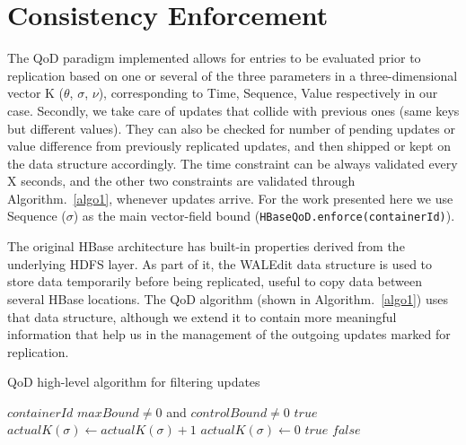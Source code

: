 \section{Consistency Enforcement}\label{architecture:consistency}
The QoD paradigm implemented allows for entries to be evaluated prior to replication based on one or several of the three parameters in a three-dimensional vector K ($\theta$, $\sigma$, $\nu$), corresponding to Time, Sequence, Value respectively in our case. Secondly, we take care of updates that collide with previous ones (same keys but different values). They can also be checked for number of pending updates or value difference from previously replicated updates, and then shipped or kept on the data structure accordingly. The time constraint can be always validated every X seconds, and the other two constraints are validated through Algorithm.~\ref{algo1}, whenever updates arrive. For the work presented here we use Sequence ($\sigma$) as the main vector-field bound (\texttt{HBaseQoD.enforce(containerId)}).

The original HBase architecture has built-in properties derived from the underlying HDFS layer. As part of it, the WALEdit data structure is used to store data temporarily before being replicated, useful to copy data between several HBase locations. The QoD algorithm (shown in Algorithm.~\ref{algo1}) uses that data structure, although we extend it to contain more meaningful information that help us in the management of the outgoing updates marked for replication.

\begin{algorithm*}
\caption{QoD high-level algorithm for filtering updates}
\label{algo1}
\begin{algorithmic}[1]
\REQUIRE $containerId$
\ENSURE $maxBound \neq 0$ and $controlBound \neq 0$
\RETURN $true$
\STATE $actualK(\sigma) \leftarrow actualK(\sigma)+1$
	\STATE $actualK(\sigma) \leftarrow 0$
	\RETURN $true$
	\ELSE
	\RETURN $false$
	\ENDIF
\ENDIF
\ENDWHILE
\end{algorithmic}
\end{algorithm*}

